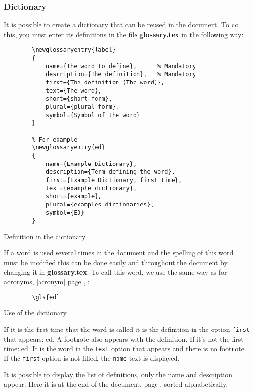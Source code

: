 \subsubsection{Dictionary} \label{dictionary}
It is possible to create a dictionary that can be reused in the document.
To do this, you must enter its definitions in the file \textbf{glossary.tex} in the following way:
\begin{code}
    \begin{verbatim}
        \newglossaryentry{label}
        {
            name={The word to define},      % Mandatory
            description={The definition},   % Mandatory
            first={The definition (The word)},
            text={The word},
            short={short form},
            plural={plural form},
            symbol={Symbol of the word}
        }

        % For example
        \newglossaryentry{ed}
        {
            name={Example Dictionary},
            description={Term defining the word},
            first={Example Dictionary, first time},
            text={example dictionary},
            short={example},
            plural={examples dictionaries},
            symbol={ED}
        }
\end{verbatim}
    \caption{Definition in the dictionary}
\end{code}

If a word is used several times in the document and the spelling of this word must be modified
this can be done easily and throughout the document by changing it in \textbf{glossary.tex}.
To call this word, we use the same way as for acronyms, \ref{acronym} page \pageref{acronym}, :
\begin{code}
    \begin{verbatim}
        \gls{ed}
\end{verbatim}
    \caption{Use of the dictionary}
\end{code}

If it is the first time that the word is called it is the definition in the option
\texttt{first} that appears: \gls{ed}. A footnote also appears with the definition.
\newline
If it's not the first time: \gls{ed}. It is the word in the \texttt{text} option that
appears and there is no footnote.
If the \texttt{first} option is not filled, the \texttt{name} text is
displayed.

It is possible to display the list of definitions, only the name and description appear. Here it is
at the end of the document, page \pageref{domaindictionary}, sorted alphabetically.

